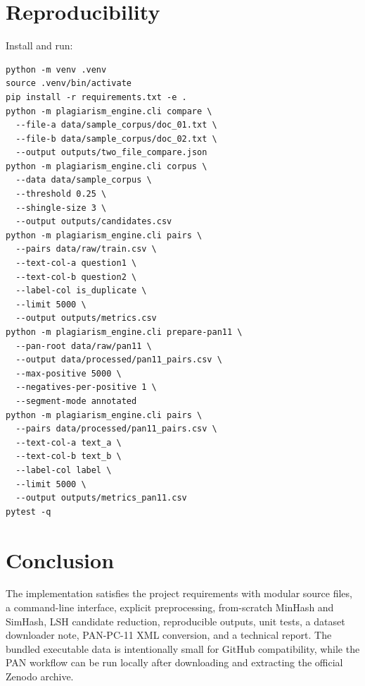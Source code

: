 \documentclass[11pt,a4paper]{article}
\begin{document}
\section{Reproducibility}
Install and run:
\begin{verbatim}
python -m venv .venv
source .venv/bin/activate
pip install -r requirements.txt -e .
python -m plagiarism_engine.cli compare \
  --file-a data/sample_corpus/doc_01.txt \
  --file-b data/sample_corpus/doc_02.txt \
  --output outputs/two_file_compare.json
python -m plagiarism_engine.cli corpus \
  --data data/sample_corpus \
  --threshold 0.25 \
  --shingle-size 3 \
  --output outputs/candidates.csv
python -m plagiarism_engine.cli pairs \
  --pairs data/raw/train.csv \
  --text-col-a question1 \
  --text-col-b question2 \
  --label-col is_duplicate \
  --limit 5000 \
  --output outputs/metrics.csv
python -m plagiarism_engine.cli prepare-pan11 \
  --pan-root data/raw/pan11 \
  --output data/processed/pan11_pairs.csv \
  --max-positive 5000 \
  --negatives-per-positive 1 \
  --segment-mode annotated
python -m plagiarism_engine.cli pairs \
  --pairs data/processed/pan11_pairs.csv \
  --text-col-a text_a \
  --text-col-b text_b \
  --label-col label \
  --limit 5000 \
  --output outputs/metrics_pan11.csv
pytest -q
\end{verbatim}

\section{Conclusion}
The implementation satisfies the project requirements with modular source files, a command-line interface, explicit preprocessing, from-scratch MinHash and SimHash, LSH candidate reduction, reproducible outputs, unit tests, a dataset downloader note, PAN-PC-11 XML conversion, and a technical report. The bundled executable data is intentionally small for GitHub compatibility, while the PAN workflow can be run locally after downloading and extracting the official Zenodo archive.
\end{document}
